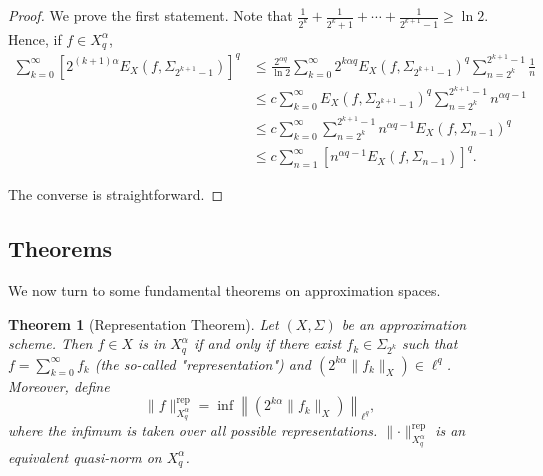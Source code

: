 \documentclass{article}
\newtheorem{theorem}{Theorem}[section]
\theoremstyle{definition}
\theoremstyle{remark}
\begin{document}
\begin{proof}
    We prove the first statement. Note that $\frac{1}{2^k} + \frac{1}{2^k+1} + \cdots + \frac{1}{2^{k+1}-1} \geq \ln 2$. Hence, if $f \in X_q^\alpha$,
    \begin{align*}
        \sum_{k=0}^\infty \left[ 2^{(k+1)\alpha}E_X(f,\Sigma_{2^{k+1}-1}) \right]^q &\leq \frac{2^{\alpha q}}{\ln 2} \sum_{k=0}^\infty 2^{k\alpha q}E_X(f,\Sigma_{2^{k+1}-1})^q \sum_{n=2^k}^{2^{k+1}-1} \frac{1}{n} \\
        &\leq c \sum_{k=0}^\infty E_X(f,\Sigma_{2^{k+1}-1})^q \sum_{n=2^k}^{2^{k+1}-1} n^{\alpha q-1} \\
        &\leq c \sum_{k=0}^\infty \sum_{n=2^k}^{2^{k+1}-1} n^{\alpha q-1}E_X(f,\Sigma_{n-1})^q \\
        &\leq c \sum_{n=1}^\infty \left[ n^{\alpha q-1}E_X(f,\Sigma_{n-1}) \right]^q.
    \end{align*}
    
    The converse is straightforward.
\end{proof}


\subsection{Theorems}
We now turn to some fundamental theorems on approximation spaces.

\begin{theorem}[Representation Theorem]
    Let $(X,\Sigma)$ be an approximation scheme. Then $f \in X$ is in $X_q^\alpha$ if and only if there exist $f_k \in \Sigma_{2^k}$ such that $f = \sum_{k=0}^\infty f_k$  (the so-called "representation") and $\left( 2^{k\alpha} \lVert f_k \rVert_X \right) \in \ell^q$. Moreover, define
    \[\lVert f \rVert_{X_q^\alpha}^\mathrm{rep} = \inf \left\lVert \left( 2^{k\alpha} \lVert f_k \rVert_X \right) \right\rVert_{\ell^q},\]
    where the infimum is taken over all possible representations. $\lVert \cdot \rVert_{X_q^\alpha}^\mathrm{rep}$ is an equivalent quasi-norm on $X_q^\alpha$.
\end{theorem}
\end{document}

